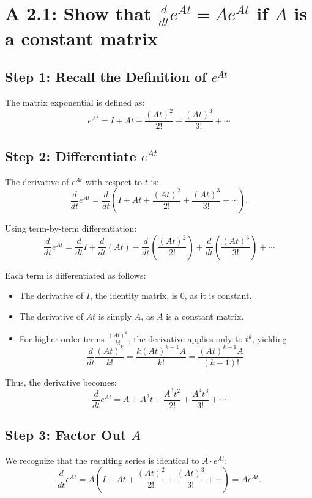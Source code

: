 \documentclass[12pt]{article}
\begin{document}
\section*{A 2.1: Show that \(\frac{d}{dt} e^{At} = A e^{At}\) if \(A\) is a constant matrix}

\subsection*{Step 1: Recall the Definition of \(e^{At}\)}

The matrix exponential is defined as:
\[
e^{At} = I + At + \frac{(At)^2}{2!} + \frac{(At)^3}{3!} + \cdots
\]

\subsection*{Step 2: Differentiate \(e^{At}\)}

The derivative of \(e^{At}\) with respect to \(t\) is:
\[
\frac{d}{dt} e^{At} = \frac{d}{dt} \left( I + At + \frac{(At)^2}{2!} + \frac{(At)^3}{3!} + \cdots \right).
\]

Using term-by-term differentiation:
\[
\frac{d}{dt} e^{At} = \frac{d}{dt} I + \frac{d}{dt}(At) + \frac{d}{dt} \left( \frac{(At)^2}{2!} \right) + \frac{d}{dt} \left( \frac{(At)^3}{3!} \right) + \cdots
\]

Each term is differentiated as follows:
\begin{itemize}
    \item The derivative of \(I\), the identity matrix, is \(0\), as it is constant.
    \item The derivative of \(At\) is simply \(A\), as \(A\) is a constant matrix.
    \item For higher-order terms \(\frac{(At)^k}{k!}\), the derivative applies only to \(t^k\), yielding:
    \[
    \frac{d}{dt} \frac{(At)^k}{k!} = \frac{k (At)^{k-1} A}{k!} = \frac{(At)^{k-1} A}{(k-1)!}.
    \]
\end{itemize}

Thus, the derivative becomes:
\[
\frac{d}{dt} e^{At} = A + A^2t + \frac{A^3t^2}{2!} + \frac{A^4t^3}{3!} + \cdots
\]

\subsection*{Step 3: Factor Out \(A\)}

We recognize that the resulting series is identical to \(A \cdot e^{At}\):
\[
\frac{d}{dt} e^{At} = A \left( I + At + \frac{(At)^2}{2!} + \frac{(At)^3}{3!} + \cdots \right) = A e^{At}.
\]
\end{document}
